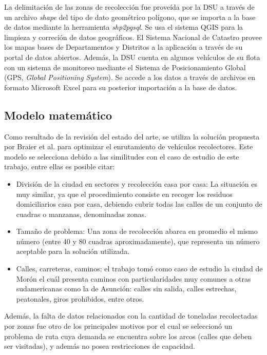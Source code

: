 \documentclass[spanish, conference]{IEEEtran}
\begin{document}
La delimitación de las zonas de recolección fue proveída por la DSU a través de un archivo \textit{shape} del tipo de dato geométrico polígono, que se importa a la base de datos mediante la herramienta \textit{shp2pgsql}. Se usa el sistema QGIS para la limpieza y correción de datos geográficos. El Sistema Nacional de Catastro provee los mapas bases de Departamentos y Distritos a la aplicación a través de su portal de datos abiertos. Además, la DSU cuenta en  algunos  vehículos  de  su  flota con un sistema de monitoreo mediante el Sistema de Posicionamiento Global (GPS, \textit{Global Positioning System}). Se accede a los datos a través de archivos en formato Microsoft Excel para su posterior importación a la base de datos.

\subsection{Modelo matemático}

Como resultado de la revisión del estado del arte, se utiliza la solución propuesta por Braier et al. \cite{Braier2017AnArgentina} para optimizar el enrutamiento de vehículos recolectores. Este modelo se selecciona debido a las similitudes con el caso de estudio de este trabajo, entre ellas es posible citar:

\begin{itemize}
    \item División de la ciudad en sectores y recolección casa por casa: La situación es muy similar, ya que el procedimiento consiste en recoger los residuos domiciliarios casa por casa, debiendo cubrir todas las calles de un conjunto de cuadras o manzanas, denominadas zonas.
    \item Tamaño de problema: Una zona de recolección abarca en promedio el mismo número (entre 40 y 80 cuadras aproximadamente), que representa un número aceptable para la solución utilizada.
    \item Calles, carreteras, caminos: el trabajo \cite{Braier2017AnArgentina} tomó como caso de estudio la ciudad de Morón el cuál presenta caminos con particularidades muy comunes a otras sudamericanas como la de Asunción: calles sin salida, calles estrechas, peatonales, giros prohibidos, entre otros.
\end{itemize}

Además, la falta de datos relacionados con la cantidad de toneladas recolectadas por zonas fue otro de los principales motivos por el cual se seleccionó un problema de ruta cuya demanda se encuentra sobre los arcos (calles que deben ser visitadas), y además no posea restricciones de capacidad.
\end{document}
